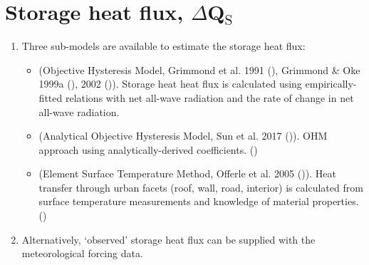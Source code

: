 \documentclass[letterpaper,10pt,english]{sphinxmanual}
\begin{document}
\section{Storage heat flux, \(\Delta\)Q$_{\text{S}}$}
\label{\detokenize{parameterisations-and-sub-models:storage-heat-flux-qs}}\begin{enumerate}
\item {} 
Three sub-models are available to estimate the storage heat flux:
\begin{itemize}
\item {} 
 (Objective Hysteresis Model, Grimmond et al. 1991 \label{\detokenize{parameterisations-and-sub-models:id8}}{\hyperref[\detokenize{references:g91ohm}]{\sphinxcrossref{{[}G91OHM{]}}}} (),
Grimmond \& Oke 1999a \label{\detokenize{parameterisations-and-sub-models:id9}}{\hyperref[\detokenize{references:go99qs}]{\sphinxcrossref{{[}GO99QS{]}}}} (), 2002 \label{\detokenize{parameterisations-and-sub-models:id10}}{\hyperref[\detokenize{references:go2002}]{\sphinxcrossref{{[}GO2002{]}}}} ()). Storage heat heat flux is
calculated using empirically-fitted relations with net all-wave
radiation and the rate of change in net all-wave radiation.

\item {} 
 (Analytical Objective Hysteresis Model, Sun et al.
2017 \label{\detokenize{parameterisations-and-sub-models:id11}}{\hyperref[\detokenize{references:anohm17}]{\sphinxcrossref{{[}AnOHM17{]}}}} ()). OHM approach using analytically-derived coefficients.
()

\item {} 
 (Element Surface Temperature Method, Offerle et al.
2005 \label{\detokenize{parameterisations-and-sub-models:id12}}{\hyperref[\detokenize{references:oaf2005}]{\sphinxcrossref{{[}Oaf2005{]}}}} ()). Heat transfer through urban facets (roof, wall, road,
interior) is calculated from surface temperature measurements and
knowledge of material properties. ()

\end{itemize}

\item {} 
Alternatively, ‘observed’ storage heat flux can be supplied with the
meteorological forcing data.

\end{enumerate}
\end{document}

